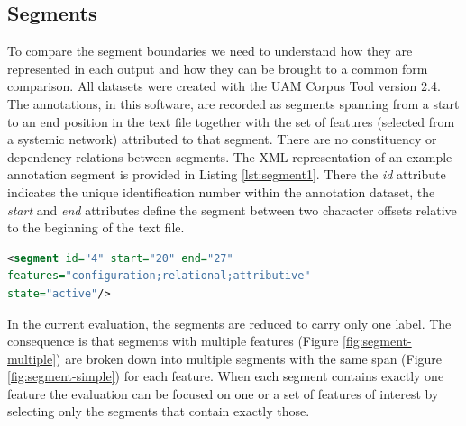 \subsection{Segments}

    To compare the segment boundaries we need to understand how they are represented in each output and how they can be brought to a common form comparison. 
    All datasets were created with the UAM Corpus Tool \citep{ODonnell2008,ODonnell2008a} version 2.4. The annotations, in this software, are recorded as segments spanning from a start to an end position in the text file together with the set of features (selected from a systemic network) attributed to that segment. There are no constituency or dependency relations between segments. The XML representation of an example annotation segment is provided in Listing \ref{lst:segment1}. There the \textit{id} attribute indicates the unique identification number within the annotation dataset, the \textit{start} and \textit{end} attributes define the segment between two character offsets relative to the beginning of the text file.

\begin{minipage}{\linewidth}
\begin{lstlisting}[language=XML,basicstyle=\small\tt,frame=single,caption=Segment example in UAM corpus tool,label=lst:segment1]
<segment id="4" start="20" end="27" 
features="configuration;relational;attributive" 
state="active"/>
\end{lstlisting}
\end{minipage}

     In the current evaluation, the segments are reduced to carry only one label. The consequence is that segments with multiple features (Figure \ref{fig:segment-multiple}) are broken down into multiple segments with the same span (Figure \ref{fig:segment-simple}) for each feature. When each segment contains exactly one feature the evaluation can be focused on one or a set of features of interest by selecting only the segments that contain exactly those. 

